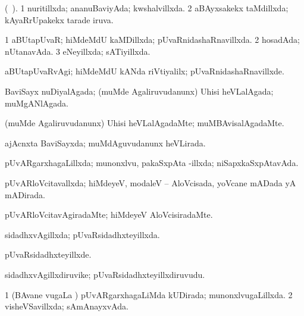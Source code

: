 {{\bentry
{} 
\gl{\gu}
\expl{}
(\ame\ ). \bmng
\bnum
\num{1} nuritillxda; ananuBaviyAda; kwshalvillxda. 
\num{2} aBAyxsakekx taMdillxda; kAyaRrUpakekx tarade iruva. 
\enum
\emng
\eentry

\bentry
{} 
\gl{\gu}
\expl{}
\bmng
\bnum
\num{1} aBUtapUvaR; hiMdeMdU kaMDillxda; pUvaRnidashaRnavillxda. 
\num{2} hosadAda; nUtanavAda. 
\num{3} eNeyillxda; sATiyillxda. 
\enum
\emng
\eentry

\bentry
{} 
\gl{\kirxvi}
\expl{}
\bmng
aBUtapUvaRvAgi; hiMdeMdU kANda riVtiyalilx; pUvaRnidashaRnavillxde. 
\emng
\eentry

\bentry
{} 
\gl{\gu}
\expl{}
\bmng
BaviSayx nuDiyalAgada; (muMde Agaliruvudanunx) Uhisi heVLalAgada; muMgANlAgada. 
\emng
\eentry

\bentry
{} 
\gl{\kirxvi}
\expl{}
\bmng
(muMde Agaliruvudanunx) Uhisi heVLalAgadaMte; muMBAvisalAgadaMte. 
\emng
\eentry

\bentry
{} 
\gl{\gu}
\expl{}
\bmng
ajAcnxta BaviSayxda; muMdAguvudanunx heVLirada. 
\emng
\eentry

\bentry
{} 
\gl{\gu}
\expl{}
\bmng
pUvARgarxhagaLillxda; munonxlvu, pakaSxpAta -illxda; niSapxkaSxpAtavAda. 
\emng
\eentry

\bentry
{} 
\gl{\gu}
\expl{}
\bmng
pUvARloVcitavallxda; hiMdeyeV, modaleV -- AloVcisada, yoVcane mADada yA mADirada. 
\emng
\eentry

\bentry
{} 
\gl{\kirxvi}
\expl{}
\bmng
pUvARloVcitavAgiradaMte; hiMdeyeV AloVcisiradaMte. 
\emng
\eentry

\bentry
{} 
\gl{\gu}
\expl{}
\bmng
sidadhxvAgillxda; pUvaRsidadhxteyillxda. 
\emng
\eentry

\bentry
{} 
\gl{\kirxvi}
\expl{}
\bmng
pUvaRsidadhxteyillxde. 
\emng
\eentry

\bentry
{} 
\gl{\nA}
\expl{}
\bmng
sidadhxvAgillxdiruvike; pUvaRsidadhxteyillxdiruvudu. 
\emng
\eentry

\bentry
{} 
\gl{\gu}
\expl{}
\bmng
\bnum
\num{1} (BAvane \mo vugaLa \vi) pUvARgarxhagaLiMda kUDirada; munonxlvugaLillxda. 
\num{2} visheVSavillxda; sAmAnayxvAda. 
\enum
\emng
\eentry

}}
